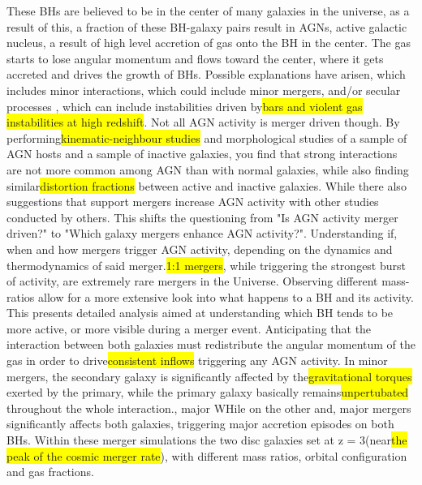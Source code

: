 \documentclass{article}
\begin{document}
\par  These BHs are believed to be in the center of many galaxies in the universe, as a result of this, a fraction of these BH-galaxy pairs result in AGNs, active galactic nucleus, a result of high level accretion of gas onto the BH in the center. The gas starts to lose angular momentum and flows toward the center, where it gets accreted and drives the growth of BHs. Possible explanations have arisen, which includes minor interactions, which could include minor mergers, and/or secular processes , which can include instabilities driven by\colorbox{yellow}{bars and violent gas instabilities at high redshift}. Not all AGN activity is merger driven though. By performing\colorbox{yellow}{kinematic-neighbour studies} and morphological studies of a sample of AGN hosts and a sample of inactive galaxies, you find that strong interactions are not more common among AGN than with normal galaxies, while also finding similar\colorbox{yellow}{distortion fractions} between active and inactive galaxies. While there also suggestions that support mergers increase AGN activity with other studies conducted by others. This shifts the questioning from "Is AGN activity merger driven?" to "Which galaxy mergers enhance AGN activity?". Understanding if, when and how mergers trigger AGN activity, depending on the dynamics and thermodynamics of said merger.\colorbox{yellow}{1:1 mergers}, while triggering the strongest burst of activity, are extremely rare mergers in the Universe. Observing different mass-ratios allow for a more extensive look into what happens to a BH and its activity. This presents detailed analysis aimed at understanding which BH tends to be more active, or more visible during a merger event. Anticipating that the interaction between both galaxies must redistribute the angular momentum of the gas in order to drive\colorbox{yellow}{consistent inflows} triggering any AGN activity. In minor mergers, the secondary galaxy is significantly affected by the\colorbox{yellow}{gravitational torques} exerted by the primary, while the primary galaxy basically remains\colorbox{yellow}{unpertubated} throughout the whole interaction., major  WHile on the other and, major mergers significantly affects both galaxies, triggering major accretion episodes on both BHs. Within these merger simulations the two disc galaxies set at z = 3(near\colorbox{yellow}{the peak of the cosmic merger rate}), with different mass ratios, orbital configuration and gas fractions.
\end{document}
